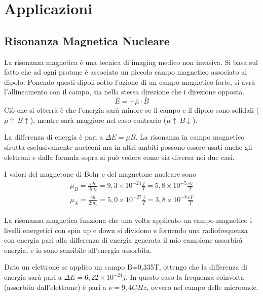 \section{Applicazioni}
\subsection{Risonanza Magnetica Nucleare}
La risonanza magnetica è una tecnica di imaging medico non invasiva.
Si basa sul fatto che ad ogni protone è associato un piccolo campo magnetico associato al dipolo. 
Ponendo questi dipoli sotto l'azione di un campo magnetico forte, si avrà l'allineamento con il campo, sia nella stessa direzione che i direzione opposta.
\begin{equation}
E=-\bar \mu\cdot \bar B
\end{equation}
Ciò che si otterrà è che l'energia sarà minore se il campo e il dipolo sono solidali ($\mu\uparrow\  B\uparrow$), mentre sarà maggiore nel caso contrario ($\mu\uparrow\  B\downarrow$).
\begin{figure}

\end{figure}
La differenza di energia è pari a $\Delta E=\mu B$.
La risonanza in campo magnetico sfrutta esclusivamente nucleoni ma in altri ambiti possono essere usati anche gli elettroni e dalla formula sopra si può vedere come sia diversa nei due casi.

I valori del magnetone di Bohr e del magnetone nucleare sono 
\begin{equation}
\begin{split}
\mu_B=\frac{e\hbar}{2m_e}=9,3\times10^{-24}\frac{j}{T}=5,8\times10^{-5}\frac{eV}{T}\\
\mu_N=\frac{e\hbar}{2m_p}=5,0\times10^{-27}\frac{j}{T}=3,8\times10^{-8}\frac{eV}{T}
\end{split}
\end{equation}

La risonanza magnetica funziona che una volta applicato un campo magnetico i livelli energetici con spin up e down si dividono e fornendo una radiofrequenza con energia pari alla differenza di energia generata il mio campione assorbirà energia, e io sono sensibile all'energia assorbita. 

Dato un elettrone se applico un campo B=0,335T, ottengo che la differenza di energia sarà pari a $\Delta E=6,22\times 10^{-24}j$.
In questo caso la frequenza coinvolta (assorbita dall'elettrone) è pari a $\nu =9,4GHz$, ovvero nel campo delle microonde.

